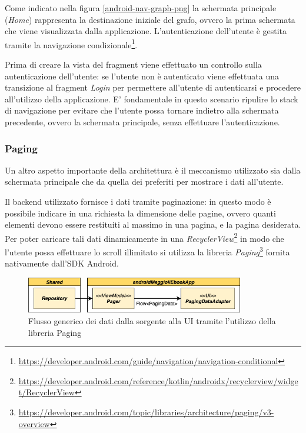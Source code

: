 Come indicato nella figura \ref{android-nav-graph-png} la schermata principale (\textit{Home}) rappresenta la destinazione iniziale del grafo, ovvero la prima schermata che viene visualizzata dalla applicazione. L'autenticazione dell'utente è gestita tramite la navigazione condizionale\footnote{\href{https://developer.android.com/guide/navigation/navigation-conditional}{https://developer.android.com/guide/navigation/navigation-conditional}}. 

Prima di creare la vista del fragment viene effettuato un controllo sulla autenticazione dell'utente: se l'utente non è autenticato viene effettuata una transizione al fragment \textit{Login} per permettere all'utente di autenticarsi e procedere all'utilizzo della applicazione. E' fondamentale in questo scenario ripulire lo stack di navigazione per evitare che l'utente possa tornare indietro alla schermata precedente, ovvero la schermata principale, senza effettuare l'autenticazione.

\subsubsection*{Paging}
\label{pagingsec}
Un altro aspetto importante della architettura è il meccanismo utilizzato sia dalla schermata principale che da quella dei preferiti per mostrare i dati all'utente. 

Il backend utilizzato fornisce i dati tramite paginazione: in questo modo è possibile indicare in una richiesta la dimensione delle pagine, ovvero quanti elementi devono essere restituiti al massimo in una pagina, e la pagina desiderata. Per poter caricare tali dati dinamicamente in una \textit{RecyclerView}\footnote{\href{https://developer.android.com/reference/kotlin/androidx/recyclerview/widget/RecyclerView}{https://developer.android.com/reference/kotlin/androidx/recyclerview/widget/RecyclerView}} in modo che l'utente possa effettuare lo scroll illimitato si utilizza la libreria \textit{Paging}\footnote{\href{https://developer.android.com/topic/libraries/architecture/paging/v3-overview}{https://developer.android.com/topic/libraries/architecture/paging/v3-overview}} fornita nativamente dall'SDK Android.

\begin{figure}[H]
    \centering
    \includegraphics[width=0.85\textwidth]{img/android-paging.png}
    \caption{Flusso generico dei dati dalla sorgente alla UI tramite l'utilizzo della libreria Paging}
    \label{android-paging}
\end{figure}

